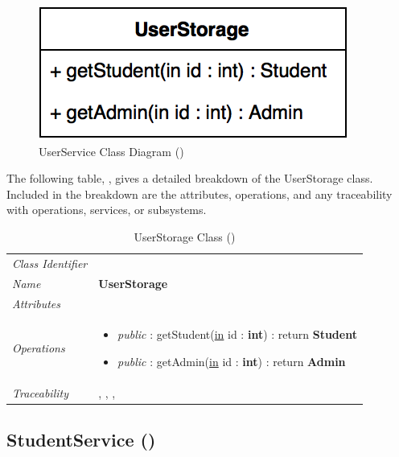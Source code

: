\documentclass[12pt,letterpaper]{article}
\begin{document}
\begin{figure}[H]
	\centering{}
	\includegraphics[scale=0.35]{imgs/d3/interfaces/user.png}
	\caption{UserService Class Diagram ()}
\end{figure}

The following table, , gives a detailed breakdown of the UserStorage class. Included in the breakdown are the attributes, operations, and any traceability with operations, services, or subsystems.

\begin{table}[H]
    \caption{UserStorage Class ()} 
	\begin{tabu} to 
		\toprule
		Class Identifier &  \\
		Name & {\bf UserStorage} \\
		Attributes & \\

		Operations &
		\begin{minipage}[t]{\linewidth}
			\begin{itemize}
			    \item {\it public} : getStudent(\underline{in} id : {\bf int}) : return {\bf Student}
			    \item {\it public} : getAdmin(\underline{in} id : {\bf int}) : return {\bf Admin}
	        \end{itemize}
	    \end{minipage} \\
	    	Traceability & , , , \\
		\toprule
	\end{tabu}
\end{table}

\subsection{StudentService ()}
\end{document}
